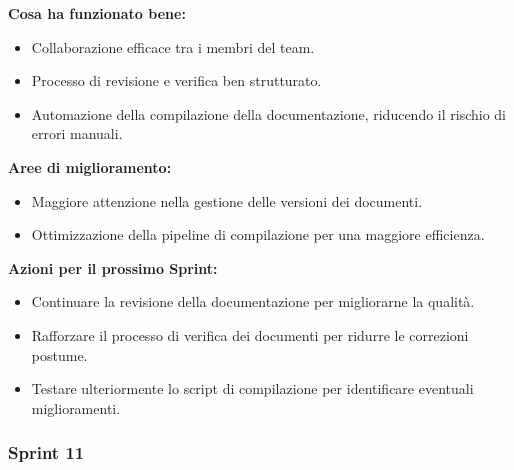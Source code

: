 \documentclass{article}
\begin{document}
                \textbf{Cosa ha funzionato bene:}
                \begin{itemize}
                    \item Collaborazione efficace tra i membri del team.
                    \item Processo di revisione e verifica ben strutturato.
                    \item Automazione della compilazione della documentazione, riducendo il rischio di errori manuali.
                \end{itemize}
                
                \textbf{Aree di miglioramento:}
                \begin{itemize}
                    \item Maggiore attenzione nella gestione delle versioni dei documenti.
                    \item Ottimizzazione della pipeline di compilazione per una maggiore efficienza.
                \end{itemize}
                
                \textbf{Azioni per il prossimo Sprint:}
                \begin{itemize}
                    \item Continuare la revisione della documentazione per migliorarne la qualità.
                    \item Rafforzare il processo di verifica dei documenti per ridurre le correzioni postume.
                    \item Testare ulteriormente lo script di compilazione per identificare eventuali miglioramenti.
                \end{itemize}
            \subsubsection{Sprint 11}
\end{document}
